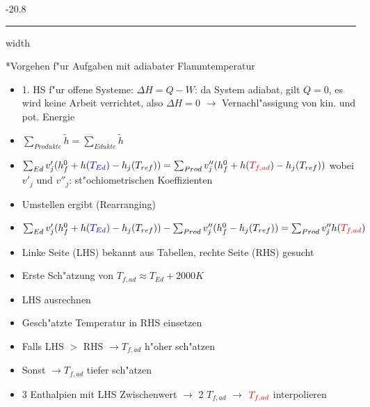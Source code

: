 \documentclass[8pt, landscape, fleqn]{scrartcl}
\makeatletter
\renewcommand{\subsubsection}{\@startsection{subsubsection}{1}{0mm}%
{-2\baselineskip}{0.8\baselineskip}%
{\hrule depth 0.2pt width\columnwidth\vspace*{1.2em}\normalsize\bfseries\rmfamily}}
\makeatother
\begin{document}
\begin{multicols*}{3}
\subsubsection*{Vorgehen f"ur Aufgaben mit adiabater Flammtemperatur}
\begin{itemize}
\item 1. HS f"ur offene Systeme: $\Delta H = Q - W$: da System adiabat, gilt $Q = 0$, es wird keine Arbeit verrichtet, also $\Delta H = 0$ $\rightarrow$ Vernachl"assigung von kin. und pot. Energie
\item $\sum_{Produkte} \tilde{h} = \sum_{Edukte} \tilde{h} $
\item $\sum_{Ed} v'_j (h_f^{0} + h(\textcolor{blue}{T_{Ed}}) - h_j(T_{ref}) ) =  \sum_{Prod} v''_j (h_f^{0} + h(\textcolor{red}{T_{f,ad}}) - h_j(T_{ref}) )$ wobei $v'_j$ und $v''_j$: st"ochiometrischen Koeffizienten
\item Umstellen ergibt (Rearranging)
\item $ \sum_{Ed} v'_j (h_f^{0} + h(\textcolor{blue}{T_{Ed}}) - h_j(T_{ref}) ) - \sum_{Prod} v''_j (h_f^{0} - h_j(T_{ref}) ) = \sum_{Prod} v''_j h(\textcolor{red}{T_{f,ad}})$
\item Linke Seite (LHS) bekannt aus Tabellen, rechte Seite (RHS) gesucht
\item Erste Sch"atzung von $T_{f,ad} \approx T_{Ed} +2000 K$
\item LHS ausrechnen
\item Gesch"atzte Temperatur in RHS einsetzen
\item Falls LHS $>$ RHS $\rightarrow T_{f,ad}$ h"oher sch"atzen
\item Sonst $\rightarrow T_{f,ad}$ tiefer sch"atzen
\item 3 Enthalpien mit LHS Zwischenwert $\rightarrow$ 2 $T_{f,ad}$ $\rightarrow$ $\textcolor{red}{T_{f,ad}}$ interpolieren
\end{itemize}




\end{multicols*}
\end{document}

